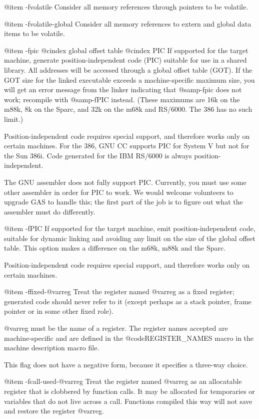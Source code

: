 {{@item -fvolatile
Consider all memory references through pointers to be volatile.

@item -fvolatile-global
Consider all memory references to extern and global data items to
be volatile.

@item -fpic
@cindex global offset table
@cindex PIC
If supported for the target machine, generate position-independent code
(PIC) suitable for use in a shared library.  All addresses will be
accessed through a global offset table (GOT).  If the GOT size for the
linked executable exceeds a machine-specific maximum size, you will get
an error message from the linker indicating that @samp{-fpic} does not
work; recompile with @samp{-fPIC} instead.  (These maximums are 16k on
the m88k, 8k on the Sparc, and 32k on the m68k and RS/6000.  The 386 has
no such limit.)

Position-independent code requires special support, and therefore works
only on certain machines.  For the 386, GNU CC supports PIC for System V
but not for the Sun 386i.  Code generated for the IBM RS/6000 is always
position-independent.

The GNU assembler does not fully support PIC.  Currently, you must use
some other assembler in order for PIC to work.  We would welcome
volunteers to upgrade GAS to handle this; the first part of the job is
to figure out what the assembler must do differently.

@item -fPIC
If supported for the target machine, emit position-independent code,
suitable for dynamic linking and avoiding any limit on the size of the
global offset table.  This option makes a difference on the m68k, m88k
and the Sparc.

Position-independent code requires special support, and therefore works
only on certain machines.

@item -ffixed-@var{reg}
Treat the register named @var{reg} as a fixed register; generated code
should never refer to it (except perhaps as a stack pointer, frame
pointer or in some other fixed role).

@var{reg} must be the name of a register.  The register names accepted
are machine-specific and are defined in the @code{REGISTER_NAMES}
macro in the machine description macro file.

This flag does not have a negative form, because it specifies a
three-way choice.

@item -fcall-used-@var{reg}
Treat the register named @var{reg} as an allocatable register that is
clobbered by function calls.  It may be allocated for temporaries or
variables that do not live across a call.  Functions compiled this way
will not save and restore the register @var{reg}.

}}
